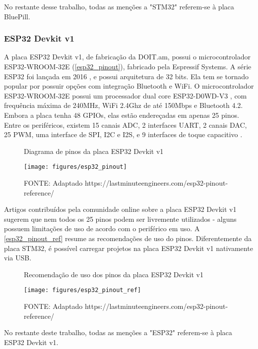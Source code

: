 No restante desse trabalho, todas as menções a "STM32" referem-se à placa
BluePill.


\subsubsection{ESP32 Devkit v1} \label{ESP32_referencia}

A placa ESP32 Devkit v1, de fabricação da DOIT.am, possui o microcontrolador
ESP32-WROOM-32E (\autoref{esp32_pinout}), fabricado pela Espressif Systems.
A série ESP32 foi lançada em 2016 \cite{anuncio_esp32}, e possui arquitetura de
32 bits. Ela tem se tornado popular por possuir opções com integração Bluetooth
e WiFi. O microcontrolador ESP32-WROOM-32E possui um processador dual core
ESP32-D0WD-V3 \cite{esp32_wroom_32e_datasheet}, com frequência máxima de 240MHz,
WiFi 2.4Ghz de até 150Mbps e Bluetooth 4.2. Embora a placa tenha 48 GPIOs, elas
estão endereçadas em apenas 25 pinos. Entre os periféricos, existem 15 canais
ADC, 2 interfaces UART, 2 canais DAC, 25 PWM, uma interface de SPI, I2C e I2S,
e 9 interfaces de toque capacitivo
\cite{esp32_reference_2} \cite{esp32_reference}.

\begin{figure}[ht]
	\centering
	\caption{Diagrama de pinos da placa ESP32 Devkit v1}
	\texttt{[image: figures/esp32\_pinout]}
	\caption*{FONTE: Adaptado https://lastminuteengineers.com/esp32-pinout-reference/}
	\label{esp32_pinout}
\end{figure}

Artigos contribuídos pela comunidade online sobre a placa ESP32 Devkit v1 
\cite{esp32_reference_2} \cite{esp32_reference} sugerem que nem todos os 25
pinos podem ser livremente utilizados - alguns possuem limitações de uso de
acordo com o periférico em uso. A \autoref{esp32_pinout_ref} resume as
recomendações de uso do pinos. Diferentemente da placa STM32, é possível
carregar projetos na placa ESP32 Devkit v1 nativamente via USB.

\begin{figure}[ht]
	\centering
	\caption{Recomendação de uso dos pinos da placa ESP32 Devkit v1}
	\texttt{[image: figures/esp32\_pinout\_ref]}
	\caption*{FONTE: Adaptado https://lastminuteengineers.com/esp32-pinout-reference/}
	\label{esp32_pinout_ref}
\end{figure}

No restante deste trabalho, todas as menções a "ESP32" referem-se à placa
ESP32 Devkit v1.


